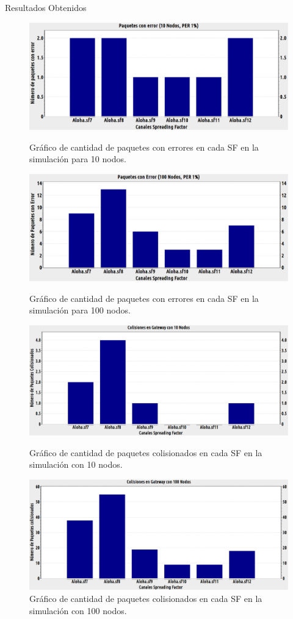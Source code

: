 \documentclass[10pt]{beamer}
\begin{document}
\begin{frame}[fragile]{Resultados Obtenidos}
\begin{figure}
\begin{overprint}
\centering\includegraphics[scale=0.2]{imagenes/errores10nodos.eps}\caption{Gráfico de cantidad de paquetes con errores en cada SF en la simulación para 10 nodos.}
\centering\includegraphics[scale=0.2]{imagenes/errores100nodos.eps}\caption{Gráfico de cantidad de paquetes con errores en cada SF en la simulación para 100 nodos.}
\centering\includegraphics[scale=0.2]{imagenes/colisiones10nodos.eps}\caption{Gráfico de cantidad de paquetes colisionados en cada SF en la simulación con 10 nodos.}
\centering\includegraphics[scale=0.2]{imagenes/colisiones100nodos.eps}\caption{Gráfico de cantidad de paquetes colisionados en cada SF en la simulación con 100 nodos.}
\end{overprint}
\end{figure}
\end{frame}
\end{document}
